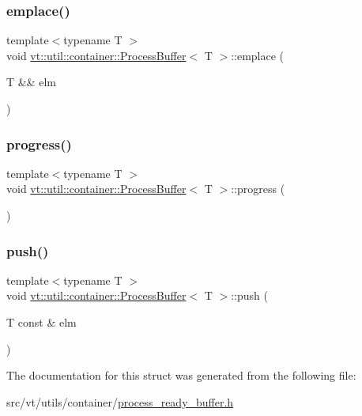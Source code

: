 \subsubsection{\texorpdfstring{emplace()}{emplace()}}
{\footnotesize\ttfamily template$<$typename T $>$ \\
void \hyperlink{structvt_1_1util_1_1container_1_1_process_buffer}{vt\+::util\+::container\+::\+Process\+Buffer}$<$ T $>$\+::emplace (\begin{DoxyParamCaption}\item[{T \&\&}]{elm }\end{DoxyParamCaption})\hspace{0.3cm}{\ttfamily [inline]}}

\mbox{\label{structvt_1_1util_1_1container_1_1_process_buffer_aab87efa377b2b94320ba7c83b568b227}} 
\subsubsection{\texorpdfstring{progress()}{progress()}}
{\footnotesize\ttfamily template$<$typename T $>$ \\
void \hyperlink{structvt_1_1util_1_1container_1_1_process_buffer}{vt\+::util\+::container\+::\+Process\+Buffer}$<$ T $>$\+::progress (\begin{DoxyParamCaption}{ }\end{DoxyParamCaption})\hspace{0.3cm}{\ttfamily [inline]}}

\mbox{\label{structvt_1_1util_1_1container_1_1_process_buffer_a1fab9ef25e64fdab844f3e3d40699ad9}} 
\subsubsection{\texorpdfstring{push()}{push()}}
{\footnotesize\ttfamily template$<$typename T $>$ \\
void \hyperlink{structvt_1_1util_1_1container_1_1_process_buffer}{vt\+::util\+::container\+::\+Process\+Buffer}$<$ T $>$\+::push (\begin{DoxyParamCaption}\item[{T const \&}]{elm }\end{DoxyParamCaption})\hspace{0.3cm}{\ttfamily [inline]}}



The documentation for this struct was generated from the following file\+:\begin{DoxyCompactItemize}
\item 
src/vt/utils/container/\hyperlink{process__ready__buffer_8h}{process\+\_\+ready\+\_\+buffer.\+h}\end{DoxyCompactItemize}
